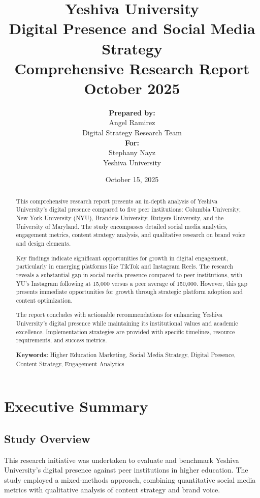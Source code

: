 \documentclass[12pt]{report}
\title{
    \Huge\textbf{Yeshiva University}\\[1cm]
    \huge\textbf{Digital Presence and Social Media Strategy}\\[0.5cm]
    \Large\textbf{Comprehensive Research Report}\\[1cm]
    \large October 2025
}
\author{
    \textbf{Prepared by:}\\
    Angel Ramirez\\
    Digital Strategy Research Team\\[1cm]
    \textbf{For:}\\
    Stephany Nayz\\
    Yeshiva University
}
\date{October 15, 2025}
\begin{document}
\maketitle
\thispagestyle{empty}

\begin{abstract}
This comprehensive research report presents an in-depth analysis of Yeshiva University's digital presence compared to five peer institutions: Columbia University, New York University (NYU), Brandeis University, Rutgers University, and the University of Maryland. The study encompasses detailed social media analytics, engagement metrics, content strategy analysis, and qualitative research on brand voice and design elements.

Key findings indicate significant opportunities for growth in digital engagement, particularly in emerging platforms like TikTok and Instagram Reels. The research reveals a substantial gap in social media presence compared to peer institutions, with YU's Instagram following at 15,000 versus a peer average of 150,000. However, this gap presents immediate opportunities for growth through strategic platform adoption and content optimization.

The report concludes with actionable recommendations for enhancing Yeshiva University's digital presence while maintaining its institutional values and academic excellence. Implementation strategies are provided with specific timelines, resource requirements, and success metrics.

\textbf{Keywords:} Higher Education Marketing, Social Media Strategy, Digital Presence, Content Strategy, Engagement Analytics
\end{abstract}

\tableofcontents
\listoffigures
\listoftables

\chapter{Executive Summary}

\section{Study Overview}
This research initiative was undertaken to evaluate and benchmark Yeshiva University's digital presence against peer institutions in higher education. The study employed a mixed-methods approach, combining quantitative social media metrics with qualitative analysis of content strategy and brand voice.
\end{document}
